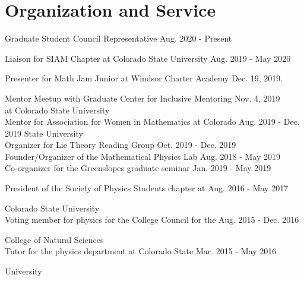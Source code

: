 \documentclass[12pt]{article} %
\begin{document}
\section{Organization and Service}
\begin{flushleft}
Graduate Student Council Representative \hfill Aug. 2020 - Present\\
\vspace*{5pt}

Liaison for SIAM Chapter at Colorado State University \hfill Aug. 2019 - May 2020\\
\vspace*{5pt}

Presenter for Math Jam Junior at Windsor Charter Academy \hfill Dec. 19, 2019.\\
\vspace*{5pt}	

Mentor Meetup with Graduate Center for Inclusive Mentoring \hfill Nov. 4, 2019\\

\noindent  at Colorado State University\\
\vspace*{5pt}
Mentor for Association for Women in Mathematics at Colorado \hfill Aug. 2019 - Dec. 2019
\noindent  State University\\
\vspace*{5pt}
Organizer for Lie Theory Reading Group \hfill Oct. 2019 - Dec. 2019\\
\vspace*{5pt}
Founder/Organizer of the Mathematical Physics Lab \hfill Aug. 2018 - May 2019\\
\vspace*{5pt}
Co-organizer for the Greenslopes graduate seminar \hfill Jan. 2019 - May 2019\\
\vspace*{5pt}

President of the Society of Physics Students chapter at \hfill Aug. 2016 - May 2017

\noindent Colorado State University\\
\vspace*{5pt}
Voting member for physics for the College Council for the \hfill Aug. 2015 - Dec. 2016

\noindent College of Natural Sciences\\
\vspace*{5pt}
Tutor for the physics department at Colorado State \hfill Mar. 2015 - May 2016

\noindent University
\end{flushleft}
\noindent\makebox[\textwidth]{\rule{\textwidth}{0.5mm}}
\end{document}
